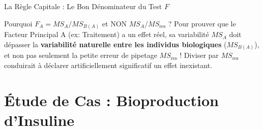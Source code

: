 \documentclass[aspectratio=169,10pt]{beamer}
\begin{document}
\begin{frame}{La Règle Capitale : Le Bon Dénominateur du Test $F$}
  \begin{table}[h]
    \centering
    \small
  \end{table}

  \begin{takeawaybox}{Pourquoi $F_A = MS_A / MS_{B(A)}$ et NON $MS_A / MS_{\text{res}}$ ?}
    Pour prouver que le Facteur Principal A (ex: Traitement) a un effet réel, sa variabilité $MS_A$ doit dépasser la \textbf{variabilité naturelle entre les individus biologiques} ($MS_{B(A)}$), et non pas seulement la petite erreur de pipetage $MS_{\text{res}}$ ! Diviser par $MS_{\text{res}}$ conduirait à déclarer artificiellement significatif un effet inexistant.
  \end{takeawaybox}
\end{frame}

\section{Étude de Cas : Bioproduction d'Insuline}
\end{document}
